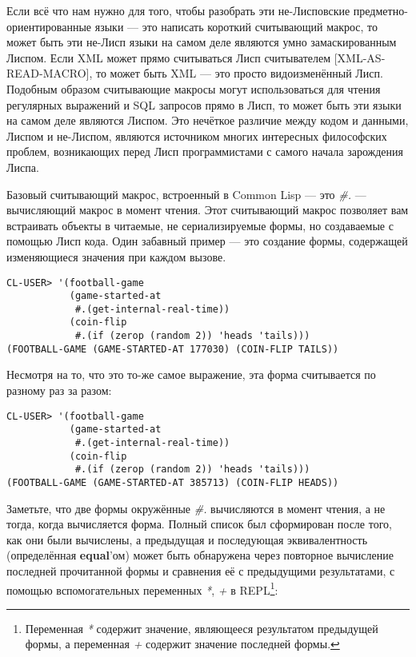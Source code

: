 Если всё что нам нужно для того, чтобы разобрать эти не-Лисповские предметно-ориентированные языки --- это написать короткий считывающий макрос, то может быть эти не-Лисп языки на самом деле являются умно замаскированным Лиспом. Если XML может прямо считываться Лисп считывателем [XML-AS-READ-MACRO], то может быть XML --- это просто видоизменённый Лисп. Подобным образом считывающие макросы могут использоваться для чтения регулярных выражений и SQL запросов прямо в Лисп, то может быть эти языки на самом деле являются Лиспом. Это нечёткое различие между кодом и данными, Лиспом и не-Лиспом, являются источником многих интересных философских проблем, возникающих перед Лисп программистами с самого начала зарождения Лиспа.

Базовый считывающий макрос, встроенный в Common Lisp --- это \emph{\#.} --- вычисляющий макрос в момент чтения. Этот считывающий макрос позволяет вам встраивать объекты в читаемые, не сериализируемые формы, но создаваемые с помощью Лисп кода. Один забавный пример --- это создание формы, содержащей изменяющиеся значения при каждом вызове.

\begin{verbatim}
CL-USER> '(football-game
           (game-started-at
            #.(get-internal-real-time))
           (coin-flip
            #.(if (zerop (random 2)) 'heads 'tails)))
(FOOTBALL-GAME (GAME-STARTED-AT 177030) (COIN-FLIP TAILS))
\end{verbatim}

Несмотря на то, что это то-же самое выражение, эта форма считывается по разному раз за разом:

\begin{verbatim}
CL-USER> '(football-game
           (game-started-at
            #.(get-internal-real-time))
           (coin-flip
            #.(if (zerop (random 2)) 'heads 'tails)))
(FOOTBALL-GAME (GAME-STARTED-AT 385713) (COIN-FLIP HEADS))
\end{verbatim}

Заметьте, что две формы окружённые \emph{\#.} вычисляются в момент чтения, а не тогда, когда вычисляется форма. Полный список был сформирован после того, как они были вычислены, а предыдущая и последующая эквивалентность (определённая \textbf{equal}'ом) может быть обнаружена через повторное вычисление последней прочитанной формы и сравнения её с предыдущими результатами, с помощью вспомогательных переменных \emph{*}, \emph{+} в REPL\footnote{Переменная \emph{*} содержит значение, являющееся результатом предыдущей формы, а переменная \emph{+} содержит значение последней формы.}:

